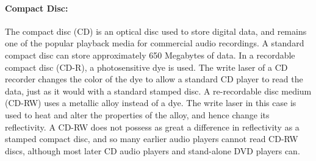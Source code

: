 \paragraph{Compact Disc:}
The compact disc (CD) is an optical disc used to store digital data, and remains one of the popular playback media for commercial audio recordings.
A standard compact disc can store approximately 650 Megabytes of data.
In a recordable compact disc (CD-R), a photosensitive dye is used.
The write laser of a CD recorder changes the color of the dye to allow a standard CD player to read the data, just as it would with a standard stamped disc.
A re-recordable disc medium (CD-RW) uses a metallic alloy instead of a dye.
The write laser in this case is used to heat and alter the properties of the alloy, and hence change its reflectivity.
A CD-RW does not possess as great a difference in reflectivity as a stamped compact disc, and so many earlier audio players cannot read CD-RW discs, although most later CD audio players and stand-alone DVD players can. 


